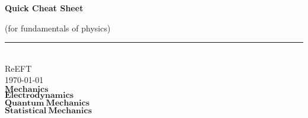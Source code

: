 \documentclass[10pt,b5paper,openany]{book} %
\newcommand{\HRule}{\rule{\linewidth}{0.5mm}}
\begin{document}
\begin{titlepage}
  \centering

  \mbox{}

  {\Huge \textbf{Quick Cheat Sheet}}

  (for fundamentals of physics) \\[0.8cm]

  \HRule \\[0.9cm]

  {\Large  ReEFT} \\[0.3cm]

  {\small \today} \\ [4.6cm]

  {\Huge $\bm{Mechanics}$} \\ [1.6cm]

  {\Huge $\bm{Electrodynamics}$} \\ [1.6cm]

  {\Huge $\bm{Quantum\ Mechanics}$} \\ [1.6cm]

  {\Huge $\bm{Statistical\ Mechanics}$} \\ [1.6cm]

\end{titlepage}

\setcounter{page}{1}

\tableofcontents
{}
\clearpage

\begin{spacing}{1.2}
\setcounter{page}{1}









\end{spacing}
\end{document}
